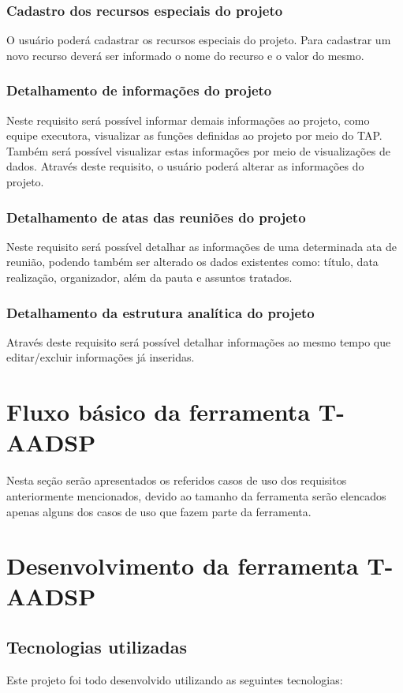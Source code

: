 \documentclass{acm_proc_article-sp}
\begin{document}
\subsubsection{Cadastro dos recursos especiais do projeto}
O usuário poderá cadastrar os recursos especiais do projeto. Para cadastrar um novo recurso deverá ser informado o nome do recurso e o valor do mesmo.

\subsubsection{Detalhamento de informações do projeto}
Neste requisito será possível informar demais informações ao projeto, como equipe executora, visualizar as funções definidas ao projeto por meio do TAP. Também será possível visualizar estas informações por meio de visualizações de dados. Através deste requisito, o usuário poderá alterar as informações do projeto. 

\subsubsection{Detalhamento de atas das reuniões do projeto}
Neste requisito será possível detalhar as informações de uma determinada ata de reunião, podendo também ser alterado os dados existentes como: título, data realização, organizador, além da pauta e assuntos tratados.

\subsubsection{Detalhamento da estrutura analítica do projeto}
Através deste requisito será possível detalhar informações ao mesmo tempo que editar/excluir informações já inseridas.

\section{Fluxo básico da ferramenta T-AADSP}
Nesta seção serão apresentados os referidos casos de uso dos requisitos anteriormente mencionados, devido ao tamanho da ferramenta serão elencados apenas alguns dos casos de uso que fazem parte da ferramenta.


\section{Desenvolvimento da ferramenta T-AADSP}
\subsection{Tecnologias utilizadas}
Este projeto foi todo desenvolvido utilizando as seguintes tecnologias:
\end{document}
